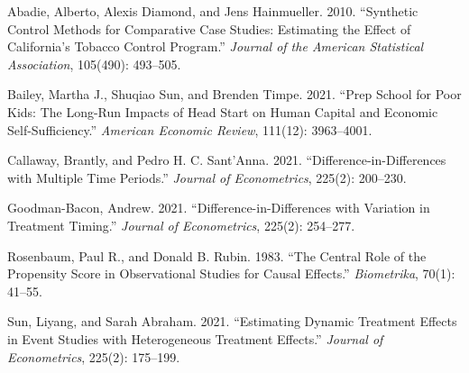 \documentclass[
  fontset=windows]{ctexart}
\begin{document}
Abadie, Alberto, Alexis Diamond, and Jens Hainmueller. 2010. ``Synthetic
Control Methods for Comparative Case Studies: Estimating the Effect of
California's Tobacco Control Program.'' \emph{Journal of the American
Statistical Association}, 105(490): 493--505.

Bailey, Martha J., Shuqiao Sun, and Brenden Timpe. 2021. ``Prep School
for Poor Kids: The Long-Run Impacts of Head Start on Human Capital and
Economic Self-Sufficiency.'' \emph{American Economic Review}, 111(12):
3963--4001.

Callaway, Brantly, and Pedro H. C. Sant'Anna. 2021.
``Difference-in-Differences with Multiple Time Periods.'' \emph{Journal
of Econometrics}, 225(2): 200--230.

Goodman-Bacon, Andrew. 2021. ``Difference-in-Differences with Variation
in Treatment Timing.'' \emph{Journal of Econometrics}, 225(2): 254--277.

Rosenbaum, Paul R., and Donald B. Rubin. 1983. ``The Central Role of the
Propensity Score in Observational Studies for Causal Effects.''
\emph{Biometrika}, 70(1): 41--55.

Sun, Liyang, and Sarah Abraham. 2021. ``Estimating Dynamic Treatment
Effects in Event Studies with Heterogeneous Treatment Effects.''
\emph{Journal of Econometrics}, 225(2): 175--199.
\end{document}
